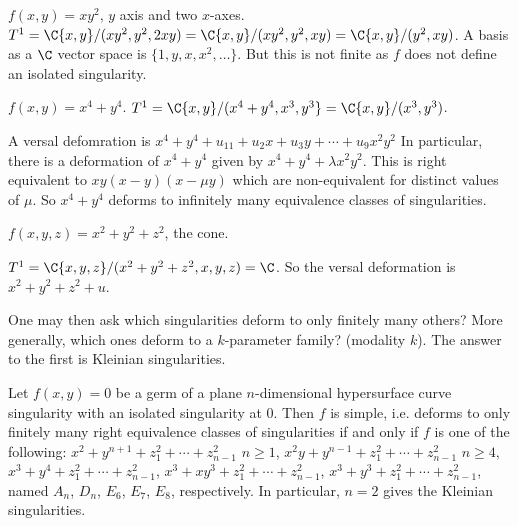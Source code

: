 \begin{ex} %
$f(x,y)= xy^2$, $y$ axis and two $x$-axes. 
$T^1= \C\{x,y\}/(xy^2,y^2,2xy)=\C\{x,y\}/(xy^2,y^2,xy)=\C\{x,y\}/(y^2,xy)$. 
A basis as a $\C$ vector space is $\{1, y, x, x^2, \ldots\}$. 
But this is not finite as $f$ does not define an isolated singularity. 
\end{ex}


\begin{ex}
$f(x,y)= x^4+y^4$.
$T^1= \C\{x,y\}/(x^4+y^4, x^3,y^3\}= \C\{x,y\}/(x^3,y^3)$. 

A versal defomration is $x^4+y^4+u_11+u_2x+u_3y+\cdots+u_{9}x^2y^2$
In particular, there is a deformation of $x^4+y^4$ given by $x^4+y^4+\lambda x^2y^2$. 
This is right equivalent to $xy(x-y)(x-\mu y)$ which are non-equivalent for distinct values of $\mu$. So $x^4+y^4$ deforms to infinitely many equivalence classes of singularities. 
\end{ex}


\begin{ex}
$f(x,y,z)= x^2+y^2+z^2$, the cone.


$T^1= \C\{x,y,z\}/(x^2+y^2+z^2, x,y,z)= \C$. 
So the versal deformation is $x^2+y^2+z^2+u$. 

\end{ex}



One may then ask which singularities deform to only finitely many others? More generally, which ones deform to a $k$-parameter family? (modality $k$). The answer to the first is Kleinian singularities. 


\begin{thm}[V.I. Arnold]
Let $f(x,y)=0$ be a germ of a plane $n$-dimensional hypersurface curve singularity with an isolated singularity at 0. Then $f$ is simple, i.e. deforms to only finitely many right equivalence classes of singularities if and only if $f$ is one of the following: $x^2+y^{n+1}+z_1^2+\cdots+z_{n-1}^2$ $n \geq 1$, $x^2y+y^{n-1}+z_1^2+\cdots+z_{n-1}^2$ $n \geq 4$, $x^3+y^4+z_1^2+\cdots+z_{n-1}^2$, $x^3+xy^3+z_1^2+\cdots+z_{n-1}^2$, $x^3+y^3+z_1^2+\cdots+z_{n-1}^2$, named $A_n$, $D_n$, $E_6$, $E_7$, $E_8$, respectively. In particular, $n=2$ gives the Kleinian singularities. 
\end{thm}





